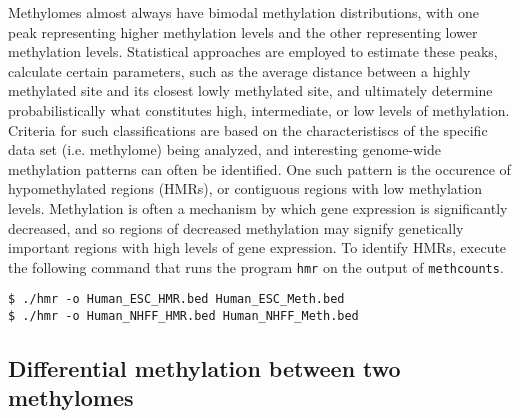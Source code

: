 \documentclass[10pt]{article}
\newcommand{\prog}[1]{\texttt{#1}}
\begin{document}
Methylomes almost always have bimodal methylation distributions, with
one peak representing higher methylation levels and the other
representing lower methylation levels. Statistical approaches are
employed to estimate these peaks, calculate certain parameters, such
as the average distance between a highly methylated site and its
closest lowly methylated site, and ultimately determine
probabilistically what constitutes high, intermediate, or low levels
of methylation. Criteria for such classifications are based on the
characteristiscs of the specific data set (i.e. methylome) being
analyzed, and interesting genome-wide methylation patterns can often
be identified. One such pattern is the occurence of hypomethylated
regions (HMRs), or contiguous regions with low methylation
levels. Methylation is often a mechanism by which gene expression is
significantly decreased, and so regions of decreased methylation may
signify genetically important regions with high levels of gene
expression. To identify HMRs, execute the following command that runs
the program \prog{hmr} on the output of \prog{methcounts}.
\begin{verbatim}
$ ./hmr -o Human_ESC_HMR.bed Human_ESC_Meth.bed
$ ./hmr -o Human_NHFF_HMR.bed Human_NHFF_Meth.bed
\end{verbatim}




\subsection{Differential methylation between two methylomes}
\label{sec:differential_methylation}
\end{document}
